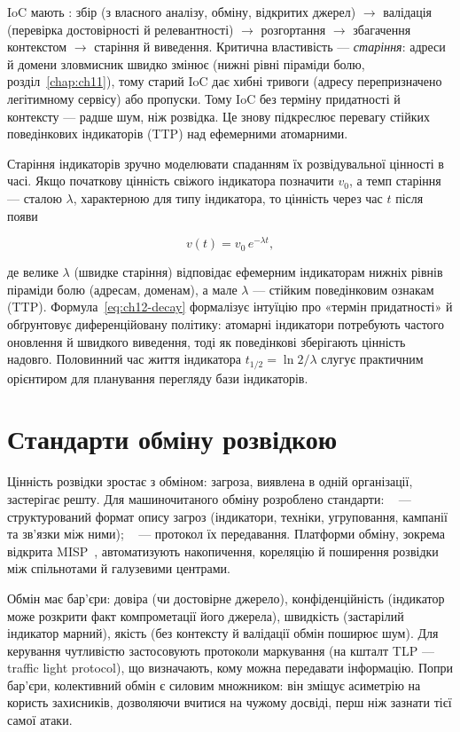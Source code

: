 IoC мають : збір (з власного аналізу, обміну, відкритих джерел) $\to$ валідація (перевірка достовірності й релевантності) $\to$ розгортання $\to$ збагачення контекстом $\to$ старіння й виведення. Критична властивість --- \emph{старіння}: адреси й домени зловмисник швидко змінює (нижні рівні піраміди болю, розділ~\ref{chap:ch11}), тому старий IoC дає хибні тривоги (адресу перепризначено легітимному сервісу) або пропуски. Тому IoC без терміну придатності й контексту --- радше шум, ніж розвідка. Це знову підкреслює перевагу стійких поведінкових індикаторів (TTP) над ефемерними атомарними.

Старіння індикаторів зручно моделювати спаданням їх розвідувальної цінності в часі. Якщо початкову цінність свіжого індикатора позначити $v_0$, а темп старіння --- сталою $\lambda$, характерною для типу індикатора, то цінність через час $t$ після появи

\begin{equation}
v(t) = v_0\,e^{-\lambda t},
\label{eq:ch12-decay}
\end{equation}

де велике $\lambda$ (швидке старіння) відповідає ефемерним індикаторам нижніх рівнів піраміди болю (адресам, доменам), а мале $\lambda$ --- стійким поведінковим ознакам (TTP). Формула~\eqref{eq:ch12-decay} формалізує інтуїцію про «термін придатності» й обґрунтовує диференційовану політику: атомарні індикатори потребують частого оновлення й швидкого виведення, тоді як поведінкові зберігають цінність надовго. Половинний час життя індикатора $t_{1/2} = \ln 2 / \lambda$ слугує практичним орієнтиром для планування перегляду бази індикаторів.

\section{Стандарти обміну розвідкою}\label{sec:ch12-sharing}

Цінність розвідки зростає з обміном: загроза, виявлена в одній організації, застерігає решту. Для машиночитаного обміну розроблено стандарти: ~\cite{stix} --- структурований формат опису загроз (індикатори, техніки, угруповання, кампанії та зв'язки між ними); ~\cite{ch12:taxii} --- протокол їх передавання. Платформи обміну, зокрема відкрита MISP~\cite{ch12:misp}, автоматизують накопичення, кореляцію й поширення розвідки між спільнотами й галузевими центрами.

Обмін має бар'єри: довіра (чи достовірне джерело), конфіденційність (індикатор може розкрити факт компрометації його джерела), швидкість (застарілий індикатор марний), якість (без контексту й валідації обмін поширює шум). Для керування чутливістю застосовують протоколи маркування (на кшталт TLP --- traffic light protocol), що визначають, кому можна передавати інформацію. Попри бар'єри, колективний обмін є силовим множником: він зміщує асиметрію на користь захисників, дозволяючи вчитися на чужому досвіді, перш ніж зазнати тієї самої атаки.

